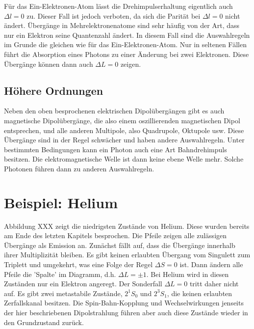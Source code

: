 Für das Ein-Elektronen-Atom lässt die Drehimpulserhaltung eigentlich auch $\Delta l = 0$ zu. Dieser Fall ist jedoch verboten, da sich die Parität bei $\Delta l = 0$ nicht ändert. Übergänge in Mehrelektronenatome sind sehr häufig von der Art, dass nur ein Elektron seine Quantenzahl ändert. In diesem Fall sind die Auswahlregeln im Grunde die gleichen wie für das Ein-Elektronen-Atom. Nur in seltenen Fällen führt die Absorption eines Photons zu einer Änderung bei zwei Elektronen. Diese Übergänge können dann auch $\Delta L = 0$ zeigen.



\subsection{Höhere Ordnungen}


Neben den oben besprochenen elektrischen Dipolübergängen gibt es auch magnetische Dipolübergänge, die also einem oszillierenden magnetischen Dipol entsprechen, und alle anderen Multipole, also Quadrupole, Oktupole usw. Diese Übergänge sind in der Regel schwächer und haben andere Auswahlregeln. Unter bestimmten Bedingungen kann ein Photon auch eine Art Bahndrehimpuls besitzen. Die elektromagnetische Welle ist dann keine ebene Welle mehr. Solche Photonen führen dann zu  anderen Auswahlregeln.



\section{Beispiel: Helium}


Abbildung XXX zeigt die niedrigsten Zustände von Helium. Diese wurden bereits am Ende des letzten Kapitels besprochen. Die Pfeile zeigen alle zulässigen Übergänge als Emission an. Zunächst fällt auf, dass die Übergänge innerhalb ihrer Multiplizität bleiben. Es gibt keinen erlaubten Übergang vom Singulett zum Triplett und umgekehrt, was eine Folge der Regel $\Delta S = 0$ ist. Dann ändern alle Pfeile die 'Spalte' im Diagramm, d.h. $\Delta L = \pm 1$. Bei Helium wird in diesen Zuständen nur ein Elektron angeregt. Der Sonderfall $\Delta L = 0$ tritt daher nicht auf. Es gibt zwei metastabile Zustände, $2^1S_0$ und $2^3S_1$, die keinen erlaubten Zerfallskanal besitzen. Die Spin-Bahn-Kopplung und Wechselwirkungen jenseits der hier beschriebenen Dipolstrahlung führen aber auch diese Zustände wieder in den Grundzustand zurück.



